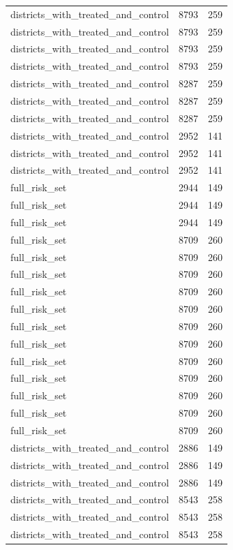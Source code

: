 \begin{table}[!htbp]
\begin{tabular}{lrr}
districts\_with\_treated\_and\_control & 8793 & 259 \\
districts\_with\_treated\_and\_control & 8793 & 259 \\
districts\_with\_treated\_and\_control & 8793 & 259 \\
districts\_with\_treated\_and\_control & 8793 & 259 \\
districts\_with\_treated\_and\_control & 8287 & 259 \\
districts\_with\_treated\_and\_control & 8287 & 259 \\
districts\_with\_treated\_and\_control & 8287 & 259 \\
districts\_with\_treated\_and\_control & 2952 & 141 \\
districts\_with\_treated\_and\_control & 2952 & 141 \\
districts\_with\_treated\_and\_control & 2952 & 141 \\
full\_risk\_set & 2944 & 149 \\
full\_risk\_set & 2944 & 149 \\
full\_risk\_set & 2944 & 149 \\
full\_risk\_set & 8709 & 260 \\
full\_risk\_set & 8709 & 260 \\
full\_risk\_set & 8709 & 260 \\
full\_risk\_set & 8709 & 260 \\
full\_risk\_set & 8709 & 260 \\
full\_risk\_set & 8709 & 260 \\
full\_risk\_set & 8709 & 260 \\
full\_risk\_set & 8709 & 260 \\
full\_risk\_set & 8709 & 260 \\
full\_risk\_set & 8709 & 260 \\
full\_risk\_set & 8709 & 260 \\
full\_risk\_set & 8709 & 260 \\
districts\_with\_treated\_and\_control & 2886 & 149 \\
districts\_with\_treated\_and\_control & 2886 & 149 \\
districts\_with\_treated\_and\_control & 2886 & 149 \\
districts\_with\_treated\_and\_control & 8543 & 258 \\
districts\_with\_treated\_and\_control & 8543 & 258 \\
districts\_with\_treated\_and\_control & 8543 & 258 \\

\end{tabular}
\end{table}

